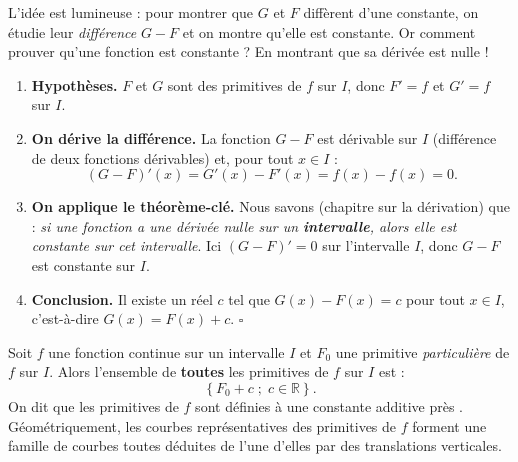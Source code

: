 \documentclass[11pt]{article}
\begin{document}
\begin{experience}
L'idée est lumineuse : pour montrer que $G$ et $F$ diffèrent d'une constante, on étudie leur \emph{différence} $G - F$ et on montre qu'elle est constante. Or comment prouver qu'une fonction est constante ? En montrant que sa dérivée est nulle !
\begin{enumerate}
\item \textbf{Hypothèses.} $F$ et $G$ sont des primitives de $f$ sur $I$, donc $F' = f$ et $G' = f$ sur $I$.
\item \textbf{On dérive la différence.} La fonction $G - F$ est dérivable sur $I$ (différence de deux fonctions dérivables) et, pour tout $x \in I$ :
\[ (G - F)'(x) = G'(x) - F'(x) = f(x) - f(x) = 0. \]
\item \textbf{On applique le théorème-clé.} Nous savons (chapitre sur la dérivation) que : \emph{si une fonction a une dérivée nulle sur un \textbf{intervalle}, alors elle est constante sur cet intervalle}. Ici $(G-F)' = 0$ sur l'intervalle $I$, donc $G - F$ est constante sur $I$.
\item \textbf{Conclusion.} Il existe un réel $c$ tel que $G(x) - F(x) = c$ pour tout $x \in I$, c'est-à-dire $G(x) = F(x) + c$. \hfill $\square$
\end{enumerate}
\end{experience}

\begin{aretenir}
Soit $f$ une fonction continue sur un intervalle $I$ et $F_0$ une primitive \emph{particulière} de $f$ sur $I$. Alors l'ensemble de \textbf{toutes} les primitives de $f$ sur $I$ est :
\[ \left\lbrace F_0 + c \; ; \; c \in \mathbb{R} \right\rbrace. \]
On dit que les primitives de $f$ sont définies \og à une constante additive près \fg{}. Géométriquement, les courbes représentatives des primitives de $f$ forment une famille de courbes toutes déduites de l'une d'elles par des translations verticales.
\end{aretenir}
\end{document}
